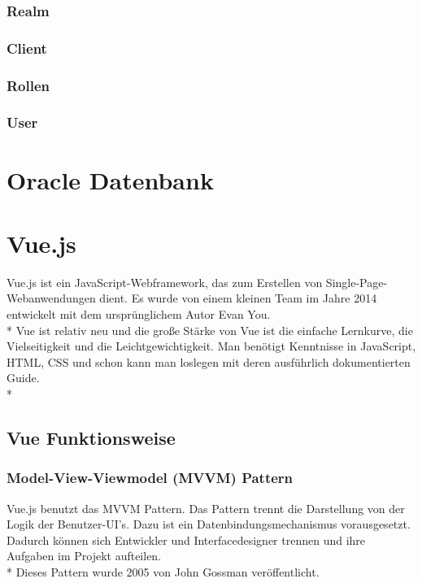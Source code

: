 \subsubsection{Realm}

\subsubsection{Client}

\subsubsection{Rollen}

\subsubsection{User}


\section{Oracle Datenbank}
\section{Vue.js}
\author{Benjamin Besic}
Vue.js ist ein JavaScript-Webframework, das zum Erstellen von Single-Page-Webanwendungen dient. 
Es wurde von einem kleinen Team im Jahre 2014 entwickelt mit dem ursprünglichem Autor Evan You.\\* Vue ist relativ neu und die große Stärke
von Vue ist die einfache Lernkurve, die Vielseitigkeit und die Leichtgewichtigkeit. Man benötigt Kenntnisse in JavaScript, HTML, CSS und schon kann man loslegen
mit deren ausführlich dokumentierten Guide\cite{VueGuide}. \cite{VueWissen} \cite{VueWiki}\\*

\subsection{Vue Funktionsweise}

\subsubsection{Model-View-Viewmodel (MVVM) Pattern }
Vue.js benutzt das MVVM Pattern. Das Pattern trennt die Darstellung von der Logik der Benutzer-UI's.
Dazu ist ein Datenbindungsmechanismus vorausgesetzt. Dadurch können sich Entwickler und Interfacedesigner trennen und ihre Aufgaben im Projekt 
aufteilen. \\*
Dieses Pattern wurde 2005 von John Gossman veröffentlicht. \cite{MVVM}

